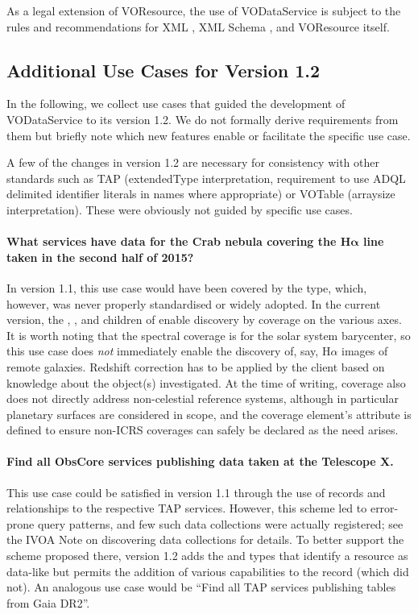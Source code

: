 \documentclass[11pt,a4paper]{ivoa}
\begin{document}
As a legal extension of VOResource, the use
of VODataService is subject to the rules and recommendations for XML
\citep{std:XML}, XML Schema \citep{std:XSD},
and VOResource itself.

\subsection{Additional Use Cases for Version 1.2}

In the following, we collect use cases that guided the development of
VODataService to its version 1.2.  We do not formally derive
requirements from them but briefly note which new features enable or
facilitate the specific use case.

A few of the changes in version 1.2 are necessary for consistency with other standards
such as TAP (extendedType interpretation, requirement to use ADQL
delimited identifier literals in names where appropriate) or VOTable
(arraysize interpretation).  These were obviously not guided by specific
use cases.


\paragraph{What services have data for the Crab nebula covering the
H$\boldsymbol\alpha$
line taken in the second half of 2015?}  In version 1.1, this use case
would have been covered by the  type,
which, however, was never properly standardised or widely adopted.  In the current
version, the , , and 
children of  enable discovery by coverage on the various
axes.  It is worth noting that the spectral coverage is for the solar
system barycenter, so this use case does \emph{not} immediately enable
the discovery of, say, H$\alpha$ images of remote galaxies.  Redshift
correction has to be applied by the client based on knowledge about the
object(s) investigated.  At the time of writing, coverage also does not
directly address non-celestial reference systems, although in particular
planetary surfaces are considered in scope, and the coverage element's
 attribute is defined to ensure non-ICRS coverages can
safely be declared as the need arises.

\paragraph{Find all ObsCore services publishing data taken at the
Telescope X.} This use case could be satisfied in version 1.1 through
the use of  records and relationships to the
respective TAP services.  However, this scheme led to error-prone query
patterns, and few such data collections were actually registered; see
the IVOA Note on discovering data collections \citep{2019ivoa.spec.0520D} for
details.  To better support the scheme proposed there, version 1.2 adds
the  and  types
that identify a resource as data-like but
permits the addition of various capabilities to the record (which
 did not).  An analogous use case would be
``Find all TAP services publishing tables from Gaia DR2''.
\end{document}
